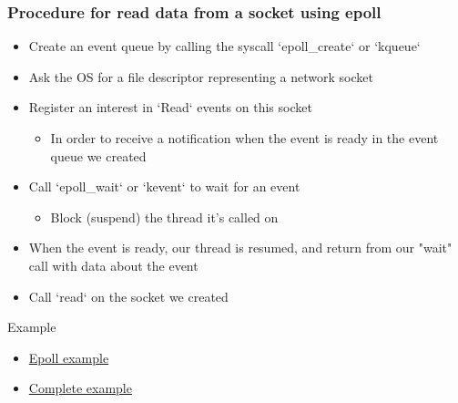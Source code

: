 \begin{frame}[fragile]
    \frametitle{Procedure for read data from a socket using epoll}
% 
% 
% 
    \begin{itemize}
        \item Create an event queue by calling the syscall `epoll\_create` or `kqueue`
        \item Ask the OS for a file descriptor representing a network socket
        \item Register an interest in `Read` events on this socket
    	\begin{itemize}
    	    \item In order to receive a notification when the event is ready in the event queue we created
    	\end{itemize}
        \item Call `epoll\_wait` or `kevent` to wait for an event
    	\begin{itemize}
    	    \item Block (suspend) the thread it's called on
    	\end{itemize}
        \item When the event is ready, our thread is resumed, and return from our "wait" call with data about the event
        \item Call `read` on the socket we created
    \end{itemize}
% 
{\color{red}Example}
% 
    \begin{itemize}
        \item \href{http://man7.org/linux/man-pages/man7/epoll.7.html}{Epoll example}
        \item \href{https://www.suchprogramming.com/epoll-in-3-easy-steps/}{Complete example}
    \end{itemize}

\end{frame}
